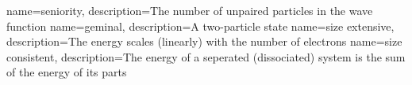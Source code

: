 {
  name=seniority,
  description={The number of unpaired particles in the wave function}
}
{
  name=geminal,
  description={A two-particle state}
}
{
  name=size extensive,
  description={The energy scales (linearly) with the number of electrons}
}
{
  name=size consistent,
  description={The energy of a seperated (dissociated) system is the sum of the energy of its parts}
}


\newtheorem{theorem}{Theorem}

\makeatletter
{}
\makeatother

\usepackage{cleveref}



